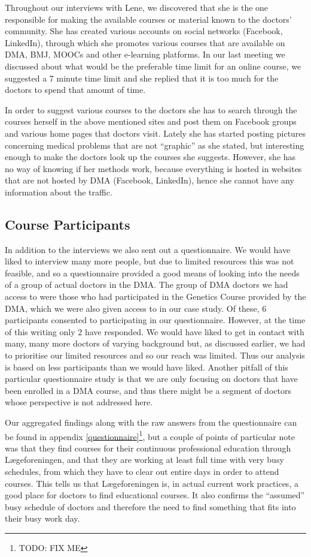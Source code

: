 Throughout our interviews with Lene, we discovered that she is the one responsible for making the available courses or material known to the doctors’ community. She has created various accounts on social networks (Facebook, LinkedIn), through which she promotes various courses that are available on DMA, BMJ, MOOCs and other e-learning platforms. In our last meeting we discussed about what would be the preferable time limit for an online course, we suggested a 7 minute time limit  and she replied that it is too much for the doctors to spend that amount of time.

In order to suggest various courses to the doctors she has to search through the courses herself in the above mentioned sites and post them on Facebook groups and various home pages that doctors visit. Lately she has started posting pictures concerning medical problems that are not “graphic” as she stated, but interesting enough to make the doctors look up the courses she suggests. However, she has no way of knowing if her methods work, because everything is hosted in websites that are not hosted by DMA (Facebook, LinkedIn), hence she cannot have any information about the traffic.

\subsection{Course Participants}
\label{indepth:questionnaire}
In addition to the interviews we also sent out a questionnaire. We would have liked to interview many more people, but due to limited resources this was not feasible, and so a questionnaire provided a good means of looking into the needs of a group of actual doctors in the DMA. The group of DMA doctors we had access to were those who had participated in the Genetics Course provided by the DMA, which we were also given access to in our case study. Of these, 6 participants consented to participating in our questionnaire. However, at the time of this writing only 2 have responded. We would have liked to get in contact with many, many more doctors of varying background but, as discussed earlier, we had to prioritise our limited resources and so our reach was limited. Thus our analysis is based on less participants than we would have liked. Another pitfall of this particular questionnaire study is that we are only focusing on doctors that have been enrolled in a DMA course, and thus there might be a segment of doctors whose perspective is not addressed here.

Our aggregated findings along with the raw answers from the questionnaire can be found in appendix \ref{questionnaire}\footnote{TODO: FIX ME}, but a couple of points of particular note was that they find courses for their continuous professional education through Lægeforeningen, and that they are working at least full time with very busy schedules, from which they have to clear out entire days in order to attend courses. This tells us that Lægeforeningen is, in actual current work practices, a good place for doctors to find educational courses. It also confirms the “assumed” busy schedule of doctors and therefore the need to find something that fits into their busy work day.

